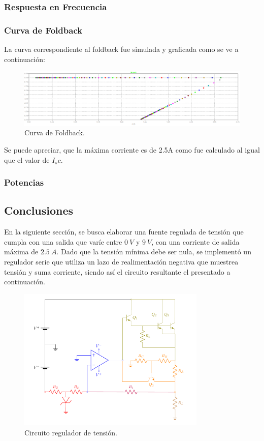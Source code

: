 \subsubsection{Respuesta en Frecuencia}
\subsubsection{Curva de Foldback}
La curva correspondiente al foldback fue simulada y graficada como se ve a continuación:
\begin{figure}[H]
\centering
	\includegraphics[width=1\textwidth]{ImagenesEjercicio2/curvefoldback.png}
	\caption{Curva de Foldback.}
	\label{fig:GraficoFOldbacki}
\end{figure}
Se puede apreciar, que la máxima corriente es de 2.5A como fue calculado al igual que el valor de $I_sc$.
\subsubsection{Potencias}
\subsection{Conclusiones}











En la siguiente sección, se busca elaborar una fuente regulada de tensión que cumpla con una salida que varíe entre $0 \ V$ y $9 \ V$, con una corriente de salida máxima de $2.5 \ A$. Dado que la tensión mínima debe ser nula, se implementó un regulador serie que utiliza un lazo de realimentación negativa que muestrea tensión y suma corriente, siendo así el circuito resultante el presentado a continuación.
\begin{figure}[H]
\centering
	\includegraphics[width=0.8\textwidth, page=1]{ImagenesEjercicio2/Regulador.pdf}
	\caption{Circuito regulador de tensión.}
	\label{fig:circuito1}
\end{figure}


